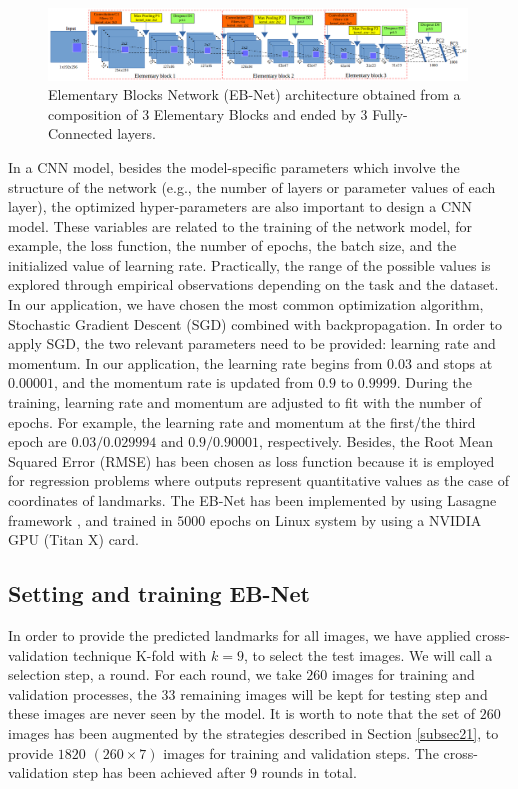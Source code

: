 \documentclass[review]{elsarticle}
\begin{document}
\begin{figure}[h!]
	\centering
	\includegraphics[width=0.99\textwidth]{images/arch_model}
	\caption{Elementary Blocks Network (EB-Net) architecture obtained from a composition of 3 Elementary Blocks and ended
        by 3 Fully-Connected layers.}
	\label{figebnet}
\end{figure}

In a CNN model, besides the model-specific parameters which involve the structure of the network (e.g., the number of layers or parameter values of each layer), the optimized hyper-parameters are also important to design a CNN model. These variables are related to the training of the network model, for example, the loss function, the number of epochs, the batch size, and the initialized value of learning rate. Practically, the range of the possible values is explored through empirical observations depending on the task and the dataset. In our application, we have chosen the most common optimization algorithm, Stochastic Gradient Descent (SGD) combined with backpropagation. In order to apply SGD, the two relevant parameters need to be provided: learning rate and momentum. In our application, the learning rate begins from $0.03$ and stops at $0.00001$, and the momentum rate is updated from $0.9$ to $0.9999$. During the training, learning rate and momentum are adjusted to fit with the number of epochs. For example, the learning rate and momentum at the first/the third epoch are $0.03/ 0.029994$ and $0.9/0.90001$, respectively. Besides, the Root Mean Squared Error (RMSE) has been chosen as loss function because it is employed for regression problems where outputs represent quantitative values as the case of coordinates of landmarks. The EB-Net has been implemented by using Lasagne framework \cite{bastien2012theano, lasagne}, and trained in $5000$ epochs on Linux system by using a NVIDIA GPU (Titan X) card.

\subsection{Setting and training EB-Net}
\label{subsec23}
In order to provide the predicted landmarks for all images, we have applied cross-validation technique K-fold with $k=9$, to select the test images. We will call a selection step, a round. For each round, we take $260$ images for training and validation processes, the $33$ remaining images will be kept for testing step and these images are never seen by the model. It is worth to note that the set of $260$ images has been augmented by the strategies described in Section \ref{subsec21}, to provide $1820$ $(260 \times 7)$ images for training and validation steps. The cross-validation step has been achieved after $9$ rounds in total. 
\end{document}
